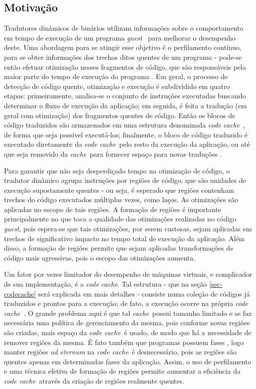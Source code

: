 \documentclass[12pt,twoside]{article}
\newcommand{\ccache}{\emph{code cache}}
\newcommand{\cache}{\emph{cache}}
\newcommand{\guest}{\emph{guest}}
\begin{document}
\subsection{Motivação}
Tradutores dinâmicos de binários utilizam informações sobre o comportamento em tempo de execução de um programa \guest~ para melhorar o desempenho deste. Uma abordagem para se atingir esse objetivo é o perfilamento contínuo, para se obter informações dos trechos ditos quentes de um programa - pode-se então efetuar otimização nesses fragmentos de código, que são responsáveis pela maior parte do tempo de execução do programa \cite{guido-2012}. Em geral, o processo de detecção de código quente, otimização e execução é subdividido em quatro etapas: primeiramente, analisa-se o conjunto de instruções executadas buscando determinar o fluxo de execução da aplicação; em seguida, é feita a tradução (em geral com otimização) dos fragmentos quentes de código. Então os blocos de código traduzidos são armazenados em uma estrutura denominada \ccache~, de forma que seja possível executá-los;  finalmente, o bloco de código traduzido é executado diretamente da \ccache~pelo resto da execução da aplicação, ou até que seja removido da \cache~para fornecer espaço para novas traduções \cite{kim-2004}.

Para garantir que não seja desperdiçado tempo na otimização de código, o tradutor dinâmico agrupa instruções por regiões de código, que são unidades de execução supostamente quentes - ou seja, é esperado que regiões contenham trechos do código executados múltiplas vezes, como laços. As otimizações são aplicadas no escopo de tais regiões. A formação de regiões é importante principalmente no que toca a qualidade das otimizações realizadas no código \guest, pois espera-se que tais otimizações, por serem custosas, sejam aplicadas em trechos de significativo impacto no tempo total de execução da aplicação. Além disso, a formação de regiões permite que sejam aplicadas transformações de código mais agressivas, pois o escopo das otimizações aumenta.

Um fator por vezes limitador do desempenho de máquinas virtuais, e complicador de sua implementação, é a \ccache. Tal estrutura - que na seção \ref{sec-codecache} será explicada em mais detalhes - consiste numa coleção de códigos já traduzidos e prontos para a execução; de fato, a execução ocorre na própria \ccache~. O grande problema aqui é que tal \cache~possui tamanho limitado e se faz necessária uma política de gerenciamento da mesma, pois conforme novas regiões são criadas, mais espaço da \ccache~é usado, de modo que há a necessidade de remover regiões da mesma. É fato também que programas possuem fases \cite{program-phases}, logo manter regiões \emph{ad eternum} na \ccache~é desnecessário, pois as regiões são quentes apenas em determinadas fases da aplicação. Assim, o uso de perfilamento e uma técnica efetiva de formação de regiões permite aumentar a eficiência da \ccache~através da criação de regiões realmente quentes.
\end{document}
